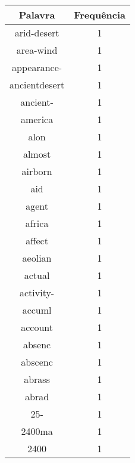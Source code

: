 \begin{tabular}{| c c |}
\hline

Palavra & Frequ{\^e}ncia \\ \hline

arid-desert & 1 \\ 

area-wind & 1 \\ 

appearance- & 1 \\ 

ancientdesert & 1 \\ 

ancient- & 1 \\ 

america & 1 \\ 

alon & 1 \\ 

almost & 1 \\ 

airborn & 1 \\ 

aid & 1 \\ 

agent & 1 \\ 

africa & 1 \\ 

affect & 1 \\ 

aeolian & 1 \\ 

actual & 1 \\ 

activity- & 1 \\ 

accuml & 1 \\ 

account & 1 \\ 

absenc & 1 \\ 

abscenc & 1 \\ 

abrass & 1 \\ 

abrad & 1 \\ 

25- & 1 \\ 

2400ma & 1 \\ 

2400 & 1 \\ 
\hline 
\end{tabular}